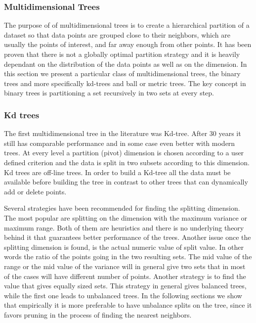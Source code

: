 \documentclass[12pt,letterpaper,doublespaced,ETD,dvips,proposal]{gtthesis}
\begin{document}
\begin{Body}
\subsubsection{Multidimensional Trees}
The purpose of of multidimensional trees is to create a hierarchical
partition of a dataset so that data points are grouped close to
their neighbors, which are usually the points of interest, and far
away enough from other points. It has been proven that there is not
a globally optimal partition strategy and it is heavily dependant on
the distribution of the data points as well as on the dimension. In
this section we present a particular class of multidimensional
trees, the binary trees and more specifically kd-trees and ball or
metric trees. The key concept in binary trees is partitioning a set
recursively in two sets at every step.

\subsubsection{Kd trees}
The first multidimensional tree in the literature was Kd-tree. After
30 years it still has comparable performance and in some case even
better with modern trees. At every level a partition (pivot)
dimension is chosen according to a user defined criterion and the
data is split in two subsets according to this dimension. Kd trees
are off-line trees. In order to build a Kd-tree all the data must be
available before building the tree in contrast to other trees that
can dynamically add or delete points.

Several strategies have been recommended for finding the splitting
dimension. The most popular are splitting on the dimension with the
maximum variance or maximum range. Both of them are heuristics and
there is no underlying theory behind it that guarantees better
performance of the trees. Another issue once the splitting dimension
is found, is the actual numeric value of split value. In other words
the ratio of the points going in the two resulting sets. The mid
value of the range or the mid value of the variance will in general
give two sets that in most of the cases will have different number
of points. Another strategy is to find the value that gives equally
sized sets. This strategy in general gives balanced trees, while the
first one leads to unbalanced trees. In the following sections we
show that empirically it is more preferable to have unbalance splits
on the tree, since it favors pruning in the process of finding the
nearest neighbors.


\end{Body}
\end{document}
